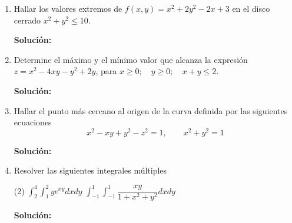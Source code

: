 \documentclass[12pt]{article}
\newenvironment{solucion}
{\begin{mdframed}[backgroundcolor=black!10]
		{\bf Solución:}\\
	}
	{
	\end{mdframed}
}
\newenvironment{preguntas}
{\begin{enumerate}\itemsep12pt
	}
	{
	\end{enumerate}
}
\begin{document}
\begin{preguntas}
\item Hallar los valores extremos de $f(x,y) = x^2+2y^2-2x+3$ en el disco cerrado $x^2+y^2 \leq 10$.
\begin{solucion}

\end{solucion}
\item Determine el máximo y el mínimo valor que alcanza la expresión $z=x^2-4xy-y^2+2y$, para $x\geq0;\quad y\geq0;\quad x+y\leq2$.
\begin{solucion}

\end{solucion}
\item Hallar el punto más cercano al origen de la curva definida por las siguientes ecuaciones
	$$x^2-xy+y^2-z^2=1,\qquad x^2+y^2=1$$
\begin{solucion}

\end{solucion}
\item Resolver las siguientes integrales múltiples
\begin{tasks}(2)
\task $\displaystyle\int_2^4 \displaystyle\int_1^2 ye^{xy}dxdy$
\task $\displaystyle\int_{-1}^1\displaystyle\int_{-1}^1 \dfrac{xy}{1+x^2+y^2}dxdy$
\end{tasks}
\begin{solucion}


\end{solucion}
\end{preguntas}
\end{document}
